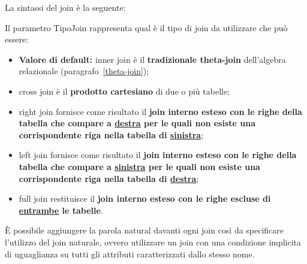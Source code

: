 \documentclass[a4paper]{article}
\begin{document}
	La sintassi del \textsf{join} è la seguente:
	
	Il parametro \textsf{TipoJoin} rappresenta qual è il tipo di join da utilizzare che può essere:
	\begin{itemize}
		\item \textbf{Valore di default:} \textcolor{Red3}{\textsf{inner join}} è il \textbf{tradizionale theta-join} dell'algebra relazionale (paragrafo~\ref{theta-join});
		
		\item \textcolor{Red3}{\textsf{cross join}} è il \textbf{prodotto cartesiano} di due o più tabelle;

		\item \textcolor{Red3}{\textsf{right join}} fornisce come risultato il \textbf{join interno esteso con le righe della tabella che compare a \underline{destra} per le quali non esiste una corrispondente riga nella tabella di \underline{sinistra}};

		\item \textcolor{Red3}{\textsf{left join}} fornisce come risultato il \textbf{join interno esteso con le righe della tabella che compare a \underline{sinistra} per le quali non esiste una corrispondente riga nella tabella di \underline{destra}};	

		\item \textcolor{Red3}{\textsf{full join}} restituisce il \textbf{join interno esteso con le righe escluse di \underline{entrambe} le tabelle}.
	\end{itemize}
	È possibile aggiungere la parola \textcolor{Red3}{\textsf{natural}} davanti ogni join così da specificare l'utilizzo del join naturale, ovvero utilizzare un join con una condizione implicita di uguaglianza su tutti gli attributi caratterizzati dallo stesso nome.\newline
	
\end{document}
